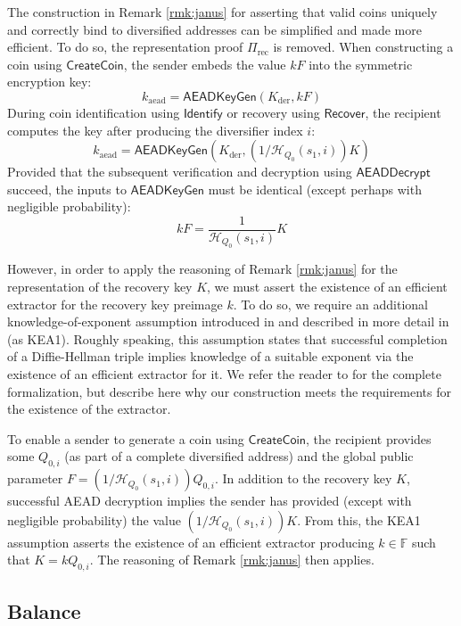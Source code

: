 \documentclass{llncs}
\newcommand{\F}{\mathbb{F}}
\newcommand{\hash}{\mathcal{H}}
\newcommand{\func}[1]{\mathsf{#1}}
\begin{document}
\begin{remark}
The construction in Remark \ref{rmk:janus} for asserting that valid coins uniquely and correctly bind to diversified addresses can be simplified and made more efficient.
To do so, the representation proof $\Pi_{\text{rec}}$ is removed.
When constructing a coin using $\func{CreateCoin}$, the sender embeds the value $kF$ into the symmetric encryption key:
$$k_{\text{aead}} = \func{AEADKeyGen}(K_{\text{der}},kF)$$
During coin identification using $\func{Identify}$ or recovery using $\func{Recover}$, the recipient computes the key after producing the diversifier index $i$:
$$k_{\text{aead}} = \func{AEADKeyGen}(K_{\text{der}},(1/\hash_{Q_0}(s_1,i))K)$$
Provided that the subsequent verification and decryption using $\func{AEADDecrypt}$ succeed, the inputs to $\func{AEADKeyGen}$ must be identical (except perhaps with negligible probability):
$$kF = \frac{1}{\hash_{Q_0}(s_1,i)}K$$

However, in order to apply the reasoning of Remark \ref{rmk:janus} for the representation of the recovery key $K$, we must assert the existence of an efficient extractor for the recovery key preimage $k$.
To do so, we require an additional knowledge-of-exponent assumption introduced in \cite{kea_damgard} and described in more detail in \cite{kea_bellare} (as KEA1).
Roughly speaking, this assumption states that successful completion of a Diffie-Hellman triple implies knowledge of a suitable exponent via the existence of an efficient extractor for it.
We refer the reader to \cite{kea_bellare} for the complete formalization, but describe here why our construction meets the requirements for the existence of the extractor.

To enable a sender to generate a coin using $\func{CreateCoin}$, the recipient provides some $Q_{0,i}$ (as part of a complete diversified address) and the global public parameter $F = (1/\hash_{Q_0}(s_1,i))Q_{0,i}$.
In addition to the recovery key $K$, successful AEAD decryption implies the sender has provided (except with negligible probability) the value $(1/\hash_{Q_0}(s_1,i))K$.
From this, the KEA1 assumption asserts the existence of an efficient extractor producing $k \in \F$ such that $K = kQ_{0,i}$.
The reasoning of Remark \ref{rmk:janus} then applies.
\end{remark}


\subsection{Balance}
\end{document}
